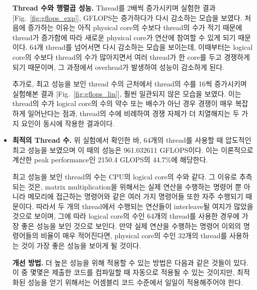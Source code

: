 \begin{itemize}
{        \textbf{Thread 수와 행렬곱 성능.}
        Thread를 2배씩 증가시키며 실험한 결과[Fig.~{\ref{fig:gflops_exp}}],
        GFLOPS는 증가하다가 다시 감소하는 모습을 보였다.
        처음에 증가하는 이유는 아직 physical core의 수보다 thread의 수가 적기 때문에 thread가 증가함에 따라
        새로운 physical core가 연산에 참여할 수 있게 되기 때문이다.
        64개 thread를 넘어서면 다시 감소하는 모습을 보이는데, 이때부터는 logical core의 수보다
        thread의 수가 많아지면서 여러 thread가 한 core를 두고 경쟁하게 되기 때문이며,
        그 과정에서 overhead가 발생하여 성능이 감소하게 된다.

        추가로, 최고 성능을 보인 thread 수의 근처에서 thread의 수를 16씩 증가시키며 실험해본 결과
        [Fig.~{\ref{fig:gflops_lin}}], 훨씬 일관되지 않은 모습을 보였다.
        이는 thread의 수가 logical core의 수의 약수 또는 배수가 아닌 경우 경쟁이 매우 복잡하게 일어난다는 점과,
        thread의 수에 비례하여 경쟁 자체가 더 치열해지는 두 가지 요인이 동시에 작용한 결과이다.
    }
    \item {
        \textbf{최적의 Thread 수.}
        위 실험에서 확인한 바, 64개의 thread를 사용할 때 압도적인 최고 성능을 보였으며
        이 때의 성능은 961.032611 GFLOPS이다.
        이는 이론적으로 계산한 peak performance인 2150.4 GLOPS의 44.7\%에 해당한다.

        최고 성능을 보인 thread의 수는 CPU의 logical core의 수와 같다. 그 이유로 추측되는 것은,
        matrix multiplication을 위해서는 실제 연산을 수행하는 명령어 뿐 아니라
        메모리에 접근하는 명령어와 같은 여러 가지 명령어들 또한 자주 수행되기 때문이다.
        따라서 두 개의 thread에서 수행되는 연산들이 interleave될 여지가 많았을 것으로 보이며,
        그에 따라 logical core의 수인 64개의 thread를 사용한 경우에 가장 좋은 성능을 보인 것으로 보인다.
        만약 실제 연산을 수행하는 명령어 이외의 명령어들의 비율이 매우 적어진다면, 
        physical core의 수인 32개의 thread를 사용하는 것이 가장 좋은 성능을 보이게 될 것이다.

        \textbf{개선 방법.}
        더 높은 성능을 위해 적용할 수 있는 방법은 다음과 같은 것들이 있다.
        이 중 몇몇은 제출한 코드를 컴파일할 때 자동으로 적용될 수 있는 것이지만,
        최적화된 성능을 얻기 위해서는 어셈블리 코드 수준에서 일일이 적용해주어야 한다.
        
}
\end{itemize}

